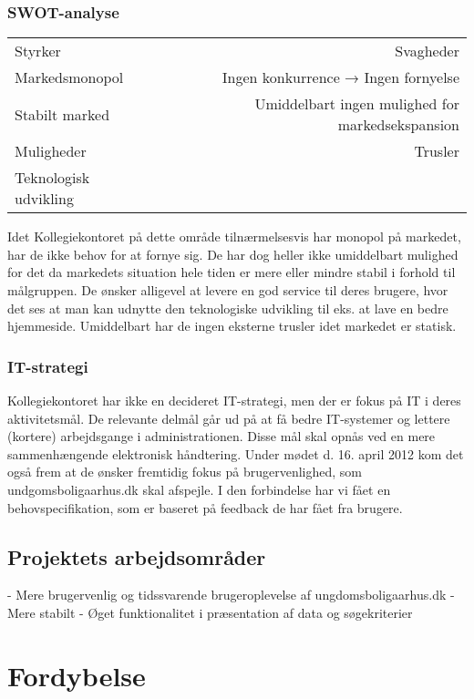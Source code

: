 \documentclass[12pt, a4paper]{report}
\begin{document}
\begin{itemize}
\subsubsection{SWOT-analyse}
\begin{tabular}{ | l | r | }
 \hline                        
 Styrker & Svagheder \\
 Markedsmonopol & Ingen konkurrence → Ingen fornyelse \\
 Stabilt marked & Umiddelbart ingen mulighed for markedsekspansion \\
Muligheder & Trusler \\
Teknologisk udvikling & \\
 \hline  
\end{tabular}
Idet Kollegiekontoret på dette område tilnærmelsesvis har monopol på markedet, har de ikke behov for at fornye sig. De har dog heller ikke umiddelbart mulighed for det da markedets situation hele tiden er mere eller mindre stabil i forhold til målgruppen. De ønsker alligevel at levere en god service til deres brugere, hvor det ses at man kan udnytte den teknologiske udvikling til eks. at lave en bedre hjemmeside. Umiddelbart har de ingen eksterne trusler idet markedet er statisk.

   \subsubsection{IT-strategi}
Kollegiekontoret har ikke en decideret IT-strategi, men der er fokus på IT i deres aktivitetsmål. De relevante delmål går ud på at få bedre IT-systemer og lettere (kortere) arbejdsgange i administrationen. Disse mål skal opnås ved en mere sammenhængende elektronisk håndtering. Under mødet d. 16. april 2012 kom det også frem at de ønsker fremtidig fokus på brugervenlighed, som undgomsboligaarhus.dk skal afspejle. I den forbindelse har vi fået en behovspecifikation, som er baseret på feedback de har fået fra brugere.

   \subsection{Projektets arbejdsområder}
- Mere brugervenlig og tidssvarende brugeroplevelse af ungdomsboligaarhus.dk
- Mere stabilt
- Øget funktionalitet i præsentation af data og søgekriterier

\section{Fordybelse}

\end{itemize}
\end{document}
